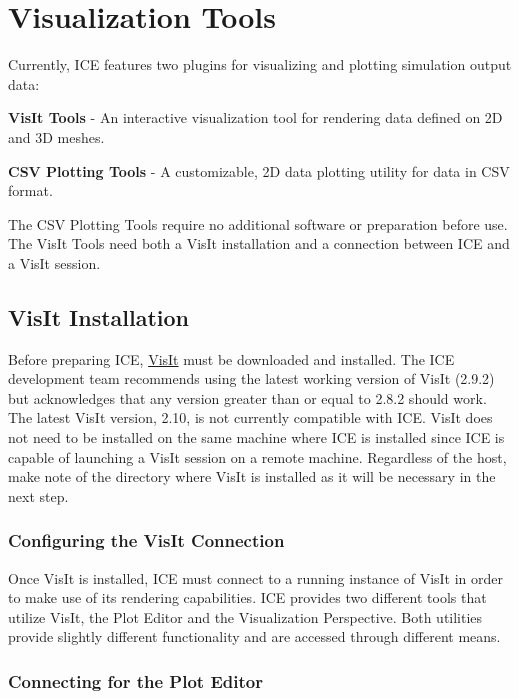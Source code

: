 \section{Visualization Tools}

Currently, ICE features two plugins for visualizing and plotting simulation
output data:

\textbf{VisIt Tools} - An interactive visualization tool for rendering data
defined on 2D and 3D meshes.

\textbf{CSV Plotting Tools} - A customizable, 2D data plotting utility for data
in CSV format.

The CSV Plotting Tools require no additional software or preparation before use.
The VisIt Tools need both a VisIt installation and a connection between ICE and
a VisIt session.

\subsection{VisIt Installation} 

Before preparing ICE,
\href{https://wci.llnl.gov/simulation/computer-codes/visit/}{VisIt} must be
downloaded and installed. The ICE development team recommends using the latest
working version of VisIt (2.9.2) but acknowledges that any version greater than 
or equal to 2.8.2 should work. The latest VisIt version, 2.10, is not currently 
compatible with ICE. VisIt does not need to be installed on the same machine 
where ICE is installed since ICE is capable of launching a VisIt session on a 
remote machine. Regardless of the host, make note of the directory where VisIt 
is installed as it will be necessary in the next step.

\subsubsection{Configuring the VisIt Connection}

Once VisIt is installed, ICE must connect to a running instance of VisIt in
order to make use of its rendering capabilities. ICE provides two different
tools that utilize VisIt, the Plot Editor and the Visualization Perspective.
Both utilities provide slightly different functionality and are accessed
through different means.

\subsubsection{Connecting for the Plot Editor} 

